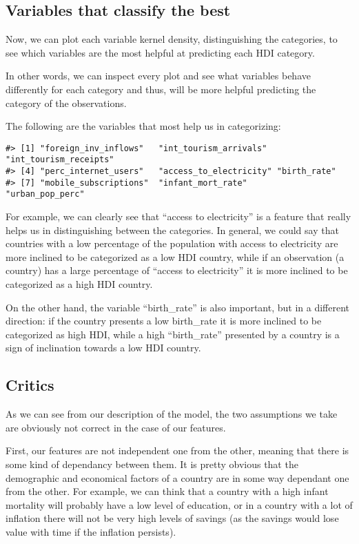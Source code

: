 \documentclass[]{article}
\begin{document}
\hypertarget{variables-that-classify-the-best}{%
\subsection{Variables that classify the
best}\label{variables-that-classify-the-best}}

Now, we can plot each variable kernel density, distinguishing the
categories, to see which variables are the most helpful at predicting
each HDI category.

In other words, we can inspect every plot and see what variables behave
differently for each category and thus, will be more helpful predicting
the category of the observations.

The following are the variables that most help us in categorizing:

\begin{verbatim}
#> [1] "foreign_inv_inflows"   "int_tourism_arrivals"  "int_tourism_receipts" 
#> [4] "perc_internet_users"   "access_to_electricity" "birth_rate"           
#> [7] "mobile_subscriptions"  "infant_mort_rate"      "urban_pop_perc"
\end{verbatim}

For example, we can clearly see that ``access to electricity'' is a
feature that really helps us in distinguishing between the categories.
In general, we could say that countries with a low percentage of the
population with access to electricity are more inclined to be
categorized as a low HDI country, while if an observation (a country)
has a large percentage of ``access to electricity'' it is more inclined
to be categorized as a high HDI country.

On the other hand, the variable ``birth\_rate'' is also important, but
in a different direction: if the country presents a low birth\_rate it
is more inclined to be categorized as high HDI, while a high
``birth\_rate'' presented by a country is a sign of inclination towards
a low HDI country.

\hypertarget{critics}{%
\subsection{Critics}\label{critics}}

As we can see from our description of the model, the two assumptions we
take are obviously not correct in the case of our features.

First, our features are not independent one from the other, meaning that
there is some kind of dependancy between them. It is pretty obvious that
the demographic and economical factors of a country are in some way
dependant one from the other. For example, we can think that a country
with a high infant mortality will probably have a low level of
education, or in a country with a lot of inflation there will not be
very high levels of savings (as the savings would lose value with time
if the inflation persists).
\end{document}
